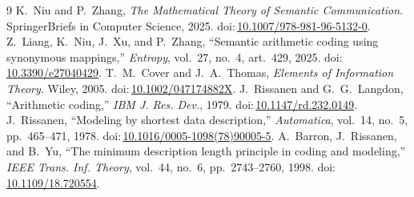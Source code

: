 \documentclass[11pt]{article}
\newcommand{\doi}[1]{doi:\,\url{#1}}
\theoremstyle{definition}
\theoremstyle{remark}
\begin{document}
\begin{thebibliography}{9}
 K.~Niu and P.~Zhang, \emph{The Mathematical Theory of Semantic Communication}. SpringerBriefs in Computer Science, 2025. \doi{10.1007/978-981-96-5132-0}.
 Z.~Liang, K.~Niu, J.~Xu, and P.~Zhang, ``Semantic arithmetic coding using synonymous mappings,'' \emph{Entropy}, vol.~27, no.~4, art.~429, 2025. \doi{10.3390/e27040429}.
 T.~M.~Cover and J.~A.~Thomas, \emph{Elements of Information Theory}. Wiley, 2005. \doi{10.1002/047174882X}.
 J.~Rissanen and G.~G.~Langdon, ``Arithmetic coding,'' \emph{IBM J. Res. Dev.}, 1979. \doi{10.1147/rd.232.0149}.
 J.~Rissanen, ``Modeling by shortest data description,'' \emph{Automatica}, vol.~14, no.~5, pp.~465--471, 1978. \doi{10.1016/0005-1098(78)90005-5}.
 A.~Barron, J.~Rissanen, and B.~Yu, ``The minimum description length principle in coding and modeling,'' \emph{IEEE Trans. Inf. Theory}, vol.~44, no.~6, pp.~2743--2760, 1998. \doi{10.1109/18.720554}.
\end{thebibliography}
\end{document}
